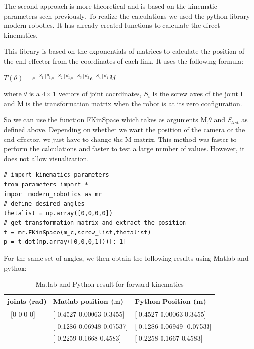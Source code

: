 \bigbreak
The second approach is more theoretical and is based on the kinematic parameters seen previously. To realize the calculations we used the python library modern robotics. It has already created functions to calculate the direct kinematics. 

\bigbreak
This library is based on the exponentials of matrices to calculate the position of the end effector from the coordinates of each link. It uses the following formula: 

\begin{center}
    $T(\theta) = e^{[S_1]\theta_1}e^{[S_2]\theta_2}e^{[S_3]\theta_3}e^{[S_4]\theta_4}M$    
\end{center}
where $\theta$ is a $4\times1$ vectors of joint coordinates, $S_i$ is the screw axes of the joint i and M is the transformation matrix when the robot is at its zero configuration.


\bigbreak
So we can use the function FKinSpace which takes as arguments M,$\theta$ and $S_{list}$ as defined above. Depending on whether we want the position of the camera or the end effector, we just have to change the M matrix. This method was faster to perform the calculations and faster to test a large number of values. However, it does not allow visualization.

\begin{verbatim}
# import kinematics parameters
from parameters import * 
import modern_robotics as mr
# define desired angles 
thetalist = np.array([0,0,0,0])
# get transformation matrix and extract the position
t = mr.FKinSpace(m_c,screw_list,thetalist)
p = t.dot(np.array([0,0,0,1]))[:-1]
\end{verbatim}

\bigbreak
For the same set of angles, we then obtain the following results using Matlab and python: 
\begin{table}[ht]
    \centering
    \begin{tabular}{|p{4cm} | p{4.5cm} | p{4.5cm}|} 
        \hline
        \textbf{joints (rad)} & \textbf{Matlab position (m)} & \textbf{Python Position (m)}\\ [0.3ex] 
        \hline\
        [0 0 0 0] & [-0.4527 0.00063 0.3455] & [-0.4527 0.00063 0.3455] \\ 
        \hline
        [pi/4,-pi/3,0,pi/3] & [-0.1286 0.06948 0.07537] & [-0.1286  0.06949 -0.07533] \\ 
        \hline
        [pi/4,pi/6,-pi/6,pi/3]& [-0.2259 0.1668 0.4583] & [-0.2258  0.1667  0.4583] \\ 
        \hline
    \end{tabular}
    \caption{Matlab and Python result for forward kinematics}
\end{table}

